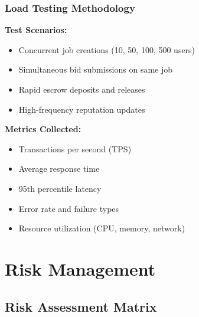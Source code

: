 \documentclass[a4paper,13pt,twoside]{report}
\theoremstyle{definition}
\begin{document}
\subsubsection{Load Testing Methodology}

\textbf{Test Scenarios:}
\begin{itemize}
    \item Concurrent job creations (10, 50, 100, 500 users)
    \item Simultaneous bid submissions on same job
    \item Rapid escrow deposits and releases
    \item High-frequency reputation updates
\end{itemize}

\textbf{Metrics Collected:}
\begin{itemize}
    \item Transactions per second (TPS)
    \item Average response time
    \item 95th percentile latency
    \item Error rate and failure types
    \item Resource utilization (CPU, memory, network)
\end{itemize}

\section{Risk Management}

\subsection{Risk Assessment Matrix}
\end{document}
